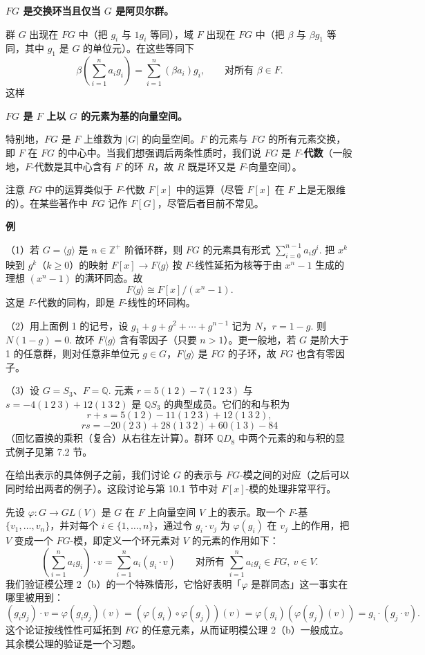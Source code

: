 \noindent\textbf{\(FG\) 是交换环当且仅当 \(G\) 是阿贝尔群。}

群 \(G\) 出现在 \(FG\) 中（把 \(g_i\) 与 \(1g_i\) 等同），域 \(F\) 出现在 \(FG\) 中（把 \(\beta\) 与 \(\beta g_1\) 等同，其中 \(g_1\) 是 \(G\) 的单位元）。在这些等同下
\[
\beta\left(\sum_{i=1}^{n}a_ig_i\right) = \sum_{i=1}^{n}(\beta a_i)g_i, \qquad \text{对所有 } \beta \in F.
\]
这样

\noindent\textbf{\(FG\) 是 \(F\) 上以 \(G\) 的元素为基的向量空间。}

特别地，\(FG\) 是 \(F\) 上维数为 \(|G|\) 的向量空间。\(F\) 的元素与 \(FG\) 的所有元素交换，即 \(F\) 在 \(FG\) 的中心中。当我们想强调后两条性质时，我们说 \(FG\) 是 \(F\)-\textbf{代数}（一般地，\(F\)-代数是其中心含有 \(F\) 的环 \(R\)，故 \(R\) 既是环又是 \(F\)-向量空间）。

注意 \(FG\) 中的运算类似于 \(F\)-代数 \(F[x]\) 中的运算（尽管 \(F[x]\) 在 \(F\) 上是无限维的）。在某些著作中 \(FG\) 记作 \(F[G]\)，尽管后者目前不常见。

\noindent\textbf{例}

（1）若 \(G = \langle g\rangle\) 是 \(n \in \mathbb{Z}^+\) 阶循环群，则 \(FG\) 的元素具有形式 \(\sum_{i=0}^{n-1}a_ig^i\). 把 \(x^k\) 映到 \(g^k\)（\(k \geq 0\)）的映射 \(F[x] \to F\langle g\rangle\) 按 \(F\)-线性延拓为核等于由 \(x^n-1\) 生成的理想 \((x^n-1)\) 的满环同态。故
\[
F\langle g\rangle \cong F[x]/(x^n-1).
\]
这是 \(F\)-代数的同构，即是 \(F\)-线性的环同构。

（2）用上面例 1 的记号，设 \(g_1 + g + g^2+\cdots+g^{n-1}\) 记为 \(N\)，\(r = 1-g\). 则 \(N(1-g) = 0\). 故环 \(F\langle g\rangle\) 含有零因子（只要 \(n > 1\)）。更一般地，若 \(G\) 是阶大于 1 的任意群，则对任意非单位元 \(g \in G\)，\(F\langle g\rangle\) 是 \(FG\) 的子环，故 \(FG\) 也含有零因子。

（3）设 \(G = S_3\)、\(F = \mathbb{Q}\). 元素 \(r = 5(1\ 2)-7(1\ 2\ 3)\) 与 \(s = -4(1\ 2\ 3)+12(1\ 3\ 2)\) 是 \(\mathbb{Q}S_3\) 的典型成员。它们的和与积为
\[
r+s = 5(1\ 2)-11(1\ 2\ 3)+12(1\ 3\ 2),
\]
\[
rs = -20(2\ 3)+28(1\ 3\ 2)+60(1\ 3)-84
\]
（回忆置换的乘积（复合）从右往左计算）。群环 \(\mathbb{Q}D_8\) 中两个元素的和与积的显式例子见第 7.2 节。

在给出表示的具体例子之前，我们讨论 \(G\) 的表示与 \(FG\)-模之间的对应（之后可以同时给出两者的例子）。这段讨论与第 10.1 节中对 \(F[x]\)-模的处理非常平行。

先设 \(\varphi : G \to GL(V)\) 是 \(G\) 在 \(F\) 上向量空间 \(V\) 上的表示。取一个 \(F\)-基 \(\{v_1, \ldots, v_n\}\)，并对每个 \(i \in \{1, \ldots, n\}\)，通过令 \(g_i \cdot v_j\) 为 \(\varphi(g_i)\) 在 \(v_j\) 上的作用，把 \(V\) 变成一个 \(FG\)-模，即定义一个环元素对 \(V\) 的元素的作用如下：
\[
\left(\sum_{i=1}^{n}a_ig_i\right)\cdot v = \sum_{i=1}^{n}a_i(g_i \cdot v) \qquad \text{对所有 } \sum_{i=1}^{n}a_ig_i \in FG,\ v \in V.
\]
我们验证模公理 2（b）的一个特殊情形，它恰好表明「\(\varphi\) 是群同态」这一事实在哪里被用到：
\[
(g_ig_j)\cdot v = \varphi(g_ig_j)(v) = (\varphi(g_i)\circ\varphi(g_j))(v) = \varphi(g_i)(\varphi(g_j)(v)) = g_i \cdot (g_j \cdot v).
\]
这个论证按线性性可延拓到 \(FG\) 的任意元素，从而证明模公理 2（b）一般成立。其余模公理的验证是一个习题。

